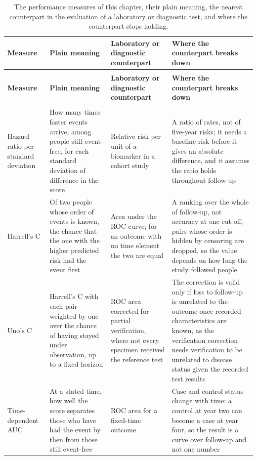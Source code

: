 {\footnotesize
\renewcommand{\arraystretch}{1.15}
\begin{longtable}{>{\raggedright\arraybackslash}p{2.3cm} >{\raggedright\arraybackslash}p{3.7cm} >{\raggedright\arraybackslash}p{3.3cm} >{\raggedright\arraybackslash}p{4.4cm}}
\caption{The performance measures of this chapter, their plain meaning, the nearest counterpart in the evaluation of a laboratory or diagnostic test, and where the counterpart stops holding.}\label{tab:prog-labparallel}\\
\toprule
\textbf{Measure} & \textbf{Plain meaning} & \textbf{Laboratory or diagnostic counterpart} & \textbf{Where the counterpart breaks down} \\
\midrule
\endfirsthead
\multicolumn{4}{@{}l}{\textit{Continued from the previous page}}\\
\toprule
\textbf{Measure} & \textbf{Plain meaning} & \textbf{Laboratory or diagnostic counterpart} & \textbf{Where the counterpart breaks down} \\
\midrule
\endhead
\midrule
\multicolumn{4}{@{}r}{\textit{Continued on the next page}}\\
\endfoot
\endlastfoot
Hazard ratio per standard deviation & How many times faster events arrive, among people still event-free, for each standard deviation of difference in the score & Relative risk per unit of a biomarker in a cohort study & A ratio of rates, not of five-year risks; it needs a baseline risk before it gives an absolute difference, and it assumes the ratio holds throughout follow-up \\
\addlinespace
Harrell's C & Of two people whose order of events is known, the chance that the one with the higher predicted risk had the event first & Area under the ROC curve; for an outcome with no time element the two are equal & A ranking over the whole of follow-up, not accuracy at one cut-off; pairs whose order is hidden by censoring are dropped, so the value depends on how long the study followed people \\
\addlinespace
Uno's C & Harrell's C with each pair weighted by one over the chance of having stayed under observation, up to a fixed horizon & ROC area corrected for partial verification, where not every specimen received the reference test & The correction is valid only if loss to follow-up is unrelated to the outcome once recorded characteristics are known, as the verification correction needs verification to be unrelated to disease status given the recorded test results \\
\addlinespace
Time-dependent AUC & At a stated time, how well the score separates those who have had the event by then from those still event-free & ROC area for a fixed-time outcome & Case and control status change with time: a control at year two can become a case at year four, so the result is a curve over follow-up and not one number \\

\end{longtable}}
